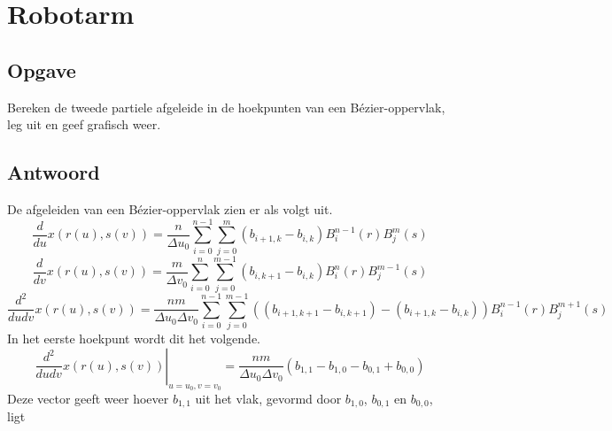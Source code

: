 \documentclass[examenvragen.tex]{subfiles}
\begin{document}
\section{Robotarm}
\subsection{Opgave}
Bereken de tweede partiele afgeleide in de hoekpunten van een B\'ezier-oppervlak, leg uit en geef grafisch weer.

\subsection{Antwoord}
De afgeleiden van een B\'ezier-oppervlak zien er als volgt uit.
\[
\frac{d}{du}x(r(u),s(v)) = \frac{n}{\Delta u_0}\sum_{i=0}^{n-1}\sum_{j=0}^{m}(b_{i+1,k}-b_{i,k})B_{i}^{n-1}(r)B_{j}^{m}(s)
\]
\[
\frac{d}{dv}x(r(u),s(v)) = \frac{m}{\Delta v_0}\sum_{i=0}^{n}\sum_{j=0}^{m-1}(b_{i,k+1}-b_{i,k})B_{i}^{n}(r)B_{j}^{m-1}(s)
\]
\[
\frac{d^2}{dudv}x(r(u),s(v)) = \frac{nm}{\Delta u_0\Delta v_0}\sum_{i=0}^{n-1}\sum_{j=0}^{m-1}\left((b_{i+1,k+1}-b_{i,k+1})-(b_{i+1,k}-b_{i,k})\right)B_{i}^{n-1}(r)B_{j}^{m+1}(s)
\]
In het eerste hoekpunt wordt dit het volgende.
\[
\left.\frac{d^2}{dudv}x(r(u),s(v))\right|_{u=u_{0},v=v_{0}} = \frac{nm}{\Delta u_0 \Delta v_0}(b_{1,1}-b_{1,0}-b_{0,1}+b_{0,0})
\]
Deze vector geeft weer hoever $b_{1,1}$ uit het vlak, gevormd door $b_{1,0}$, $b_{0,1}$ en $b_{0,0}$, ligt
\end{document}
